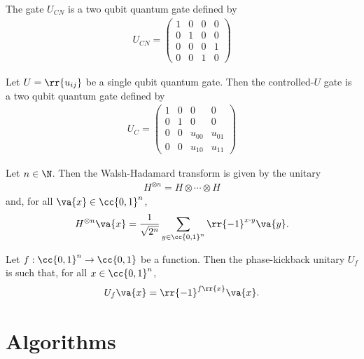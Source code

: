 \documentclass{article}
\begin{document}
\begin{definition}
  \label{def:cnot}
  The  gate $U_{CN}$ is a two qubit quantum gate defined by
  \begin{align*}
    U_{CN} = \begin{pmatrix}
      1 & 0 & 0 & 0 \\
      0 & 1 & 0 & 0 \\
      0 & 0 & 0 & 1 \\
      0 & 0 & 1 & 0
    \end{pmatrix}
  \end{align*}
\end{definition}

\begin{definition}
  \label{def:controlled-u}
  Let $U=\rr{u_{ij}}$ be a single qubit quantum gate. Then the controlled-$U$ gate is a two qubit
  quantum gate defined by
  \begin{align*}
    U_C = \begin{pmatrix}
      1 & 0 & 0 & 0 \\
      0 & 1 & 0 & 0 \\
      0 & 0 & u_{00} & u_{01} \\
      0 & 0 & u_{10} & u_{11}
    \end{pmatrix}
  \end{align*}
\end{definition}

\begin{definition}
  Let $n\in\N$. Then the Walsh-Hadamard transform is given by the unitary
  \begin{align*}
    H^{\otimes n} = H\otimes \cdots \otimes H
  \end{align*}
  and, for all $\va{x}\in\cc{0,1}^n$,
  \begin{align*}
    H^{\otimes n} \va{x} = \frac{1}{\sqrt{2^n}} \sum_{y\in\cc{0,1}^n} \rr{-1}^{x\cdot y}\va{y}.
  \end{align*}
\end{definition}

\begin{definition}
  Let $f:\cc{0,1}^n\to \cc{0,1}$ be a function. Then the phase-kickback unitary
  $U_f$ is such that, for all $x\in\cc{0,1}^n$,
  \begin{align*}
    U_f \va{x}= \rr{-1}^{f\rr{x}}\va{x}.
  \end{align*}
\end{definition}

\section{Algorithms}
\end{document}
